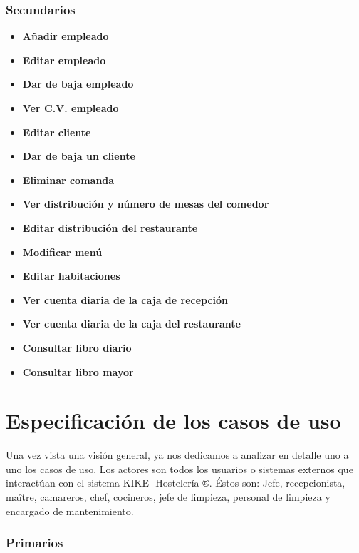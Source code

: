 \documentclass[spanish,a4paper,11pt, twoside]{report}	%
\begin{document}
\section{Secundarios}			%
	\begin{itemize}
	\item \textbf{Añadir empleado}
	\item \textbf{Editar empleado}
	\item \textbf{Dar de baja empleado}
	\item \textbf{Ver C.V. empleado}
	\item \textbf{Editar cliente}
	\item \textbf{Dar de baja un cliente}
	\item \textbf{Eliminar comanda}
	\item \textbf{Ver distribución y número de mesas del comedor}
	\item \textbf{Editar distribución del restaurante}
	\item \textbf{Modificar menú}
	\item \textbf{Editar habitaciones}
	\item \textbf{Ver cuenta diaria de la caja de recepción}
	\item \textbf{Ver cuenta diaria de la caja del restaurante}
	\item \textbf{Consultar libro diario}
	\item \textbf{Consultar libro mayor}
	\end{itemize}


\newpage
\mbox{}
\thispagestyle{empty}						%
\newpage

\setcounter{section}{0}

\part{Especificación de los casos de uso} %
Una vez vista una visión general, ya nos dedicamos a analizar en detalle uno a uno los casos de uso. Los actores son todos los usuarios o sistemas externos que interactúan con el sistema KIKE- Hostelería ®. Éstos son: Jefe, recepcionista, maître, camareros, chef, cocineros, jefe de limpieza, personal de limpieza y encargado de mantenimiento.

\section{Primarios}		 			
\end{document}
